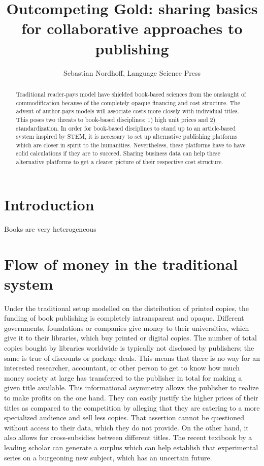 \documentclass[12pt]{article}
\title{Outcompeting Gold: sharing basics for collaborative approaches to publishing}
\author{Sebastian Nordhoff, Language Science Press}
\date{}
\begin{document}
\maketitle

\begin{abstract}
Traditional reader-pays model have shielded book-based sciences from the onslaught of commodification because of the completely opaque financing and cost structure. 
The advent of author-pays models will associate costs more closely with individual titles. This poses two threats to book-based disciplines:
1) high unit prices and  
2) standardization. In order for book-based disciplines to stand up to an article-based system inspired by STEM, it is necessary to set up alternative publishing platforms which are closer in spirit to the humanities. Nevertheless, these platforms have to have solid calculations if they are to succeed. Sharing business data can help these alternative platforms to get a clearer picture of their respective cost structure. 
\end{abstract}

\section{Introduction}
Books are very heterogeneous

\section{Flow of money in the traditional system}
Under the traditional setup modelled on the distribution of printed copies, the funding of book publishing is completely intransparent and opaque. Different governments, foundations or companies give money to their universities, which give it to their libraries, which buy printed or digital copies. The number of total copies bought by libraries worldwide is typically not disclosed by publishers; the same is true of discounts or package deals. This means that there is no way for an interested researcher, accountant, or other person to get to know how much money society at large has transferred to the publisher in total for making a given title available.  This informational asymmetry allows the publisher to realize to make profits on the one hand. They can easily justify the higher prices of their titles as compared to the competition by alleging that they are catering to a more specialized audience and sell less copies. That assertion cannot be questioned without access to their data, which they do not provide. On the other hand, it also allows for cross-subsidies between different titles. The recent textbook by a leading scholar can generate a surplus which can help establish that experimental series on a burgeoning new subject, which has an uncertain future. 
\end{document}
